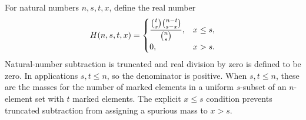 \begin{definition}
For natural numbers $n,s,t,x$, define the real number
\[
 H(n,s,t,x)=
 \begin{cases}
 \displaystyle {\binom t x\binom{n-t}{s-x}\over\binom n s},&x\le s,\\
 0,&x>s.
 \end{cases}
\]
Natural-number subtraction is truncated and real division by zero is
defined to be zero. In applications $s,t\le n$, so the denominator is
positive. When $s,t\le n$, these are the masses for the number of marked elements in a
uniform $s$-subset of an $n$-element set with $t$ marked elements. The
explicit $x\le s$ condition prevents truncated subtraction from assigning
a spurious mass to $x>s$.
\end{definition}
